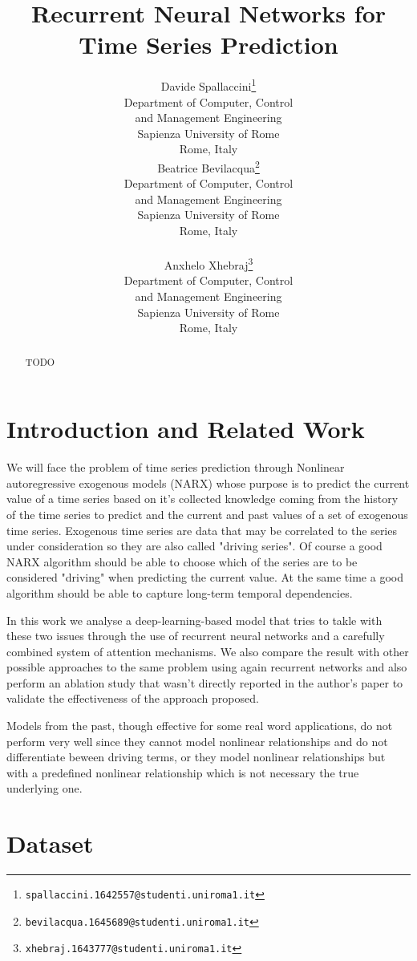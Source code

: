 \documentclass{article}
\title{Recurrent Neural Networks for Time Series Prediction}
\author{
  Davide Spallaccini\thanks{\texttt{spallaccini.1642557@studenti.uniroma1.it}} 
\\
  Department of Computer, Control \\ and Management Engineering\\
  Sapienza University of Rome\\
  Rome, Italy \\
  \And
  Beatrice Bevilacqua\thanks{\texttt{bevilacqua.1645689@studenti.uniroma1.it}} 
\\
  Department of Computer, Control \\ and Management Engineering\\
  Sapienza University of Rome\\
  Rome, Italy \\
   \\
  \And
  Anxhelo Xhebraj\thanks{\texttt{xhebraj.1643777@studenti.uniroma1.it}} \\
  Department of Computer, Control \\ and Management Engineering\\
  Sapienza University of Rome\\
  Rome, Italy
}
\begin{document}

\maketitle

\begin{abstract}

TODO

\end{abstract}

\section{Introduction and Related Work}
\label{sec:intro}

We will face the problem of time series prediction through Nonlinear 
autoregressive exogenous models (NARX) whose 
purpose is to predict the current value of a time series based on it's 
collected knowledge coming from the history of
the time series to predict and the current and past values of a set of 
exogenous time series. Exogenous time series 
are data that may be correlated to the series under consideration so they are 
also called "driving series". Of course
a good NARX algorithm should be able to choose which of the series are to be 
considered "driving" when predicting the
current value. At the same time a good algorithm should be able to capture 
long-term temporal dependencies.

In this work we analyse a deep-learning-based model that tries to takle with 
these two issues through the use of 
recurrent neural networks and a carefully combined system of attention 
mechanisms. We also compare the result with
other possible approaches to the same problem using again recurrent networks 
and also perform an ablation study that 
wasn't directly reported in the author's paper to validate the effectiveness of 
the approach proposed.

Models from the past, though effective for some real word applications, do not 
perform very well since they cannot 
model nonlinear relationships and do not differentiate beween driving terms, or 
they model nonlinear relationships 
but with a predefined nonlinear relationship which is not necessary the true 
underlying one.

\section{Dataset}
\label{sec:retrieval}
\end{document}
